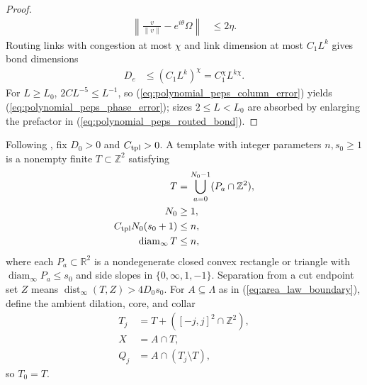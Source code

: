 \begin{proof}
\begin{align}
        \left\|\frac{v}{\|v\|}-e^{i\theta}\Omega\right\|
         & \le2\eta.
        \label{eq:polynomial_peps_column_error}
    \end{align}
    Routing links with congestion at most $\chi$ and link dimension at most
    $C_1L^k$ gives bond dimensions
    \begin{align}
        D_e & \le(C_1L^k)^\chi=C_1^\chi L^{k\chi}.
        \label{eq:polynomial_peps_routed_bond}
    \end{align}
    For $L\ge L_0$, $2CL^{-5}\le L^{-1}$, so (\ref{eq:polynomial_peps_column_error})
    yields (\ref{eq:polynomial_peps_phase_error}); sizes $2\le L<L_0$ are
    absorbed by enlarging the prefactor in (\ref{eq:polynomial_peps_routed_bond}).
\end{proof}

\begin{definition}
    \label{def:area_law_template}
    \leanok
    Following \cite[Definition~9.3]{OpenAI2026AreaLaw}, fix $D_0>0$ and
    $C_{\rm tpl}>0$. A template with integer parameters $n,s_0\ge1$ is a
    nonempty finite $T\subset\mathbb Z^2$ satisfying
    \begin{align}
        T                            & =\bigcup_{a=0}^{N_0-1}(P_a\cap\mathbb Z^2),
        \label{eq:area_law_template_cover}                                         \\
        N_0                          & \ge1,
        \label{eq:area_law_template_pieces}                                        \\
        C_{\rm tpl}N_0(s_0+1)        & \le n,
        \label{eq:area_law_template_scale}                                         \\
        \operatorname{diam}_\infty T & \le n,
        \label{eq:area_law_template_diameter}
    \end{align}
    where each $P_a\subset\mathbb R^2$ is a nondegenerate closed convex
    rectangle or triangle \cite{gap:oai26_nondegenerate_templates} with
    $\operatorname{diam}_\infty P_a\le s_0$ and side slopes in
    $\{0,\infty,1,-1\}$. Separation from a cut endpoint set $Z$ means
    $\operatorname{dist}_\infty(T,Z)>4D_0s_0$. For $A\subseteq\Lambda$ as in
    (\ref{eq:area_law_boundary}), define the ambient dilation, core, and collar
    \begin{align}
        T_j & =T+([-j,j]^2\cap\mathbb Z^2),
        \label{eq:area_law_template_dilation} \\
        X   & =A\cap T,
        \label{eq:area_law_template_core}     \\
        Q_j & =A\cap(T_j\setminus T),
        \label{eq:area_law_template_collar}
    \end{align}
    so $T_0=T$.
\end{definition}

